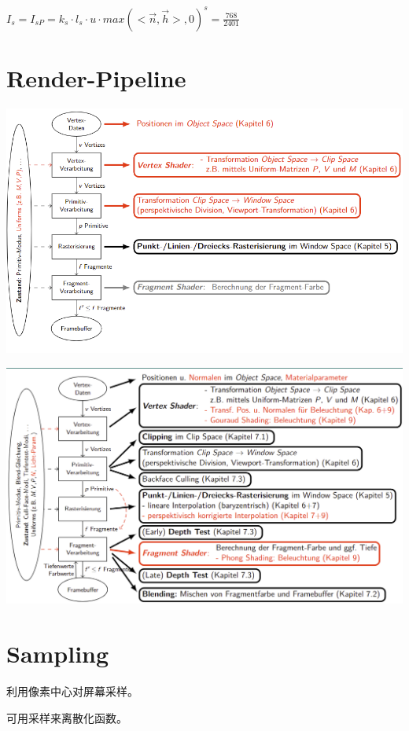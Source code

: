 \documentclass[fleqn]{article}
\begin{document}
$I_s=I_{sP}=k_s\cdot l_s \cdot u \cdot max(<\vec{n},\vec{h}>,0)^s=\frac{768}{2401}$

\section{Render-Pipeline}

\begin{center}
    \includegraphics[scale=0.45]{16.png}
\end{center}

\begin{center}
    \includegraphics[scale=0.35]{17.png}
\end{center}

\section{Sampling}

利用像素中心对屏幕采样。

可用采样来离散化函数。
\end{document}

